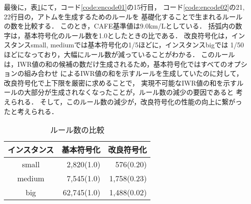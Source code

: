 最後に，表\ref{tab:result3}にて，コード\ref{code:encode01}の15行目，
コード\ref{code:encode02}の21, 22行目の，アトムを生成するためのルールを
基礎化することで生まれるルールの数を比較する．
このとき，CAFE基準値は9.0km/Lとしている．
括弧内の数字は，基本符号化のルール数を1.0としたときの比である．
改良符号化は，インスタンスsmall, mediumでは基本符号化の1/5ほどに，インスタンスbigでは
1/50ほどになっており，大幅にルール数が減っていることがわかる．
このルールは，IWR値の和の候補の数だけ生成されるため，基本符号化ではすべてのオプションの組み合わせ
によるIWR値の和を示すルールを生成していたのに対して，改良符号化で上下限を厳密に求めることで，
実現不可能なIWR値の和を示すルールの大部分が生成されなくなったことが，ルール数の減少の要因であると
考えられる．
そして，このルール数の減少が，改良符号化の性能の向上に繋がったと考えられる．




\begin{table}[tbp]
	\caption{ルール数の比較}
	\label{tab:result3}
	\centering
	\begin{tabular}{crr} \hline
	インスタンス	& 基本符号化		& 改良符号化 \\\hline
	small				& 2,820(1.0) & 576(0.20) \\
	medium			& 7,545(1.0) & 1,758(0.23) \\
	big					& 62,745(1.0) & 1,488(0.02) \\ \hline

	\end{tabular}
\end{table}

